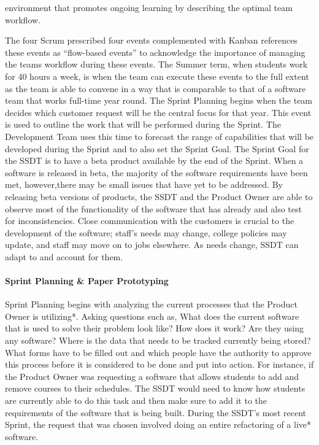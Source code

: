environment that promotes ongoing learning by describing the optimal team workflow.

The four Scrum prescribed four events complemented with Kanban references these events as ``flow-based events'' to acknowledge the importance of managing the teams workflow during these events. The Summer term, when students work for 40 hours a week, is when the team can execute these events to the full extent as the team is able to convene in a way that is comparable to that of a software team that works full-time year round. The Sprint Planning begins when the team decides which customer request will be the central focus for that year. This event is used to outline the work that will be performed during the Sprint. The Development Team uses this time to forecast the range of capabilities that will be developed during the Sprint and to also set the Sprint Goal. The Sprint Goal for the SSDT is to have a beta product available by the end of the Sprint.  When a software is released in beta, the majority of the software requirements have been met, however,there may be small issues that have yet to be addressed.  By releasing beta versions of products, the SSDT and the Product Owner are able to observe most of the functionality of the software that has already and also test for inconsistencies. Close communication with the customers is crucial to the development of the software; staff's needs may change, college policies may update, and staff may move on to jobs elsewhere. As needs change, SSDT can adapt to and account for them.



\paragraph{Sprint Planning & Paper Prototyping}
Sprint Planning begins with analyzing the current processes that the Product Owner is utilizing*. Asking questions such as, What does the current software that is used to solve their problem look like? How does it work? Are they using any software? Where is the data that needs to be tracked currently being stored? What forms have to be filled out and which people have the authority to approve this process before it is considered to be done and put into action. For instance, if the Product Owner was requesting a software that allows students to add and remove courses to their schedules. The SSDT would need to know how students are currently able to do this task and then make sure to add it to the requirements of the software that is being built. During the SSDT's most recent Sprint, the request that was chosen involved doing an entire refactoring of a live* software.

